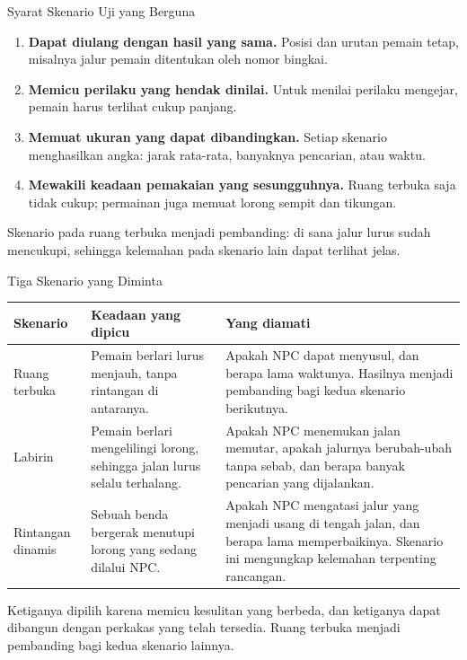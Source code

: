 \documentclass[aspectratio=169,10pt]{beamer}
\begin{document}
\begin{frame}{Syarat Skenario Uji yang Berguna}
\begin{enumerate}
  \item \textbf{Dapat diulang dengan hasil yang sama.} Posisi dan urutan pemain
        tetap, misalnya jalur pemain ditentukan oleh nomor bingkai.
  \item \textbf{Memicu perilaku yang hendak dinilai.} Untuk menilai perilaku
        mengejar, pemain harus terlihat cukup panjang.
  \item \textbf{Memuat ukuran yang dapat dibandingkan.} Setiap skenario
        menghasilkan angka: jarak rata-rata, banyaknya pencarian, atau waktu.
  \item \textbf{Mewakili keadaan pemakaian yang sesungguhnya.} Ruang terbuka saja
        tidak cukup; permainan juga memuat lorong sempit dan tikungan.
\end{enumerate}
\vspace{0.1cm}
\begin{kotak}
Skenario pada ruang terbuka menjadi pembanding: di sana jalur lurus sudah
mencukupi, sehingga kelemahan pada skenario lain dapat terlihat jelas.
\end{kotak}
\end{frame}

\begin{frame}{Tiga Skenario yang Diminta}
{\scriptsize
\renewcommand{\arraystretch}{1.34}
\begin{tabularx}{\textwidth}{@{}>{\raggedright\arraybackslash}p{2.7cm}
    >{\raggedright\arraybackslash}p{5.2cm}
    >{\raggedright\arraybackslash}X@{}}
\toprule
\textbf{Skenario} & \textbf{Keadaan yang dipicu} & \textbf{Yang diamati} \\
\midrule
Ruang terbuka &
  Pemain berlari lurus menjauh, tanpa rintangan di antaranya. &
  Apakah NPC dapat menyusul, dan berapa lama waktunya. Hasilnya menjadi
  pembanding bagi kedua skenario berikutnya. \\
\addlinespace
Labirin &
  Pemain berlari mengelilingi lorong, sehingga jalan lurus selalu terhalang. &
  Apakah NPC menemukan jalan memutar, apakah jalurnya berubah-ubah tanpa sebab,
  dan berapa banyak pencarian yang dijalankan. \\
\addlinespace
Rintangan dinamis &
  Sebuah benda bergerak menutupi lorong yang sedang dilalui NPC. &
  Apakah NPC mengatasi jalur yang menjadi usang di tengah jalan, dan berapa lama
  memperbaikinya. Skenario ini mengungkap kelemahan terpenting rancangan. \\
\bottomrule
\end{tabularx}}
\vspace{0.14cm}
\begin{kotak}
Ketiganya dipilih karena memicu kesulitan yang berbeda, dan ketiganya dapat
dibangun dengan perkakas yang telah tersedia. Ruang terbuka menjadi pembanding
bagi kedua skenario lainnya.
\end{kotak}
\end{frame}
\end{document}
